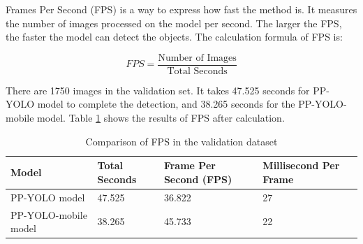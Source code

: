 \documentclass[sensors,article,submit,moreauthors,pdftex]{Definitions/mdpi}
\begin{document}
\begin{paracol}{2}
Frames Per Second (FPS) is a way to express how fast the method is. It measures the number of images processed on the model per second. The larger the FPS, the faster the model can detect the objects. The calculation formula of FPS is:

\begin{equation} 
{FPS} = \frac {\text{Number\ of\ Images}} {\text{Total\ Seconds}}
\end{equation}

There are 1750 images in the validation set. It takes 47.525 seconds for PP-YOLO model to complete the detection, and 38.265 seconds for the PP-YOLO-mobile model. Table \ref{tbl:Comparison of FPS in the validation dataset} shows the results of FPS after calculation.

\end{paracol}
\begin{table}[H]
\centering
\caption{Comparison of FPS in the validation dataset}
\begin{tabular}{llll} 
\toprule
\textbf{Model}&\textbf{Total Seconds}&\textbf{Frame Per Second (FPS)}&\textbf{Millisecond Per Frame}\\
\midrule
PP-YOLO model & 47.525&36.822&27\\
PP-YOLO-mobile model&38.265&45.733&22\\
\bottomrule
\end{tabular}
\label{tbl:Comparison of FPS in the validation dataset}
\end{table}
\end{document}
